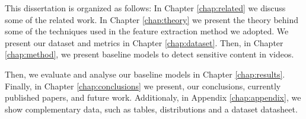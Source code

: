 This dissertation is organized as follows:
In Chapter \ref{chap:related} we discuss some of the related work.
In Chapter \ref{chap:theory} we present the theory behind some of the techniques used in the feature extraction method we adopted.
We present our dataset and metrics in Chapter \ref{chap:dataset}.
Then, in Chapter \ref{chap:method}, we present baseline models to detect sensitive content in videos.

Then, we evaluate and analyse our baseline models in Chapter \ref{chap:results}.
Finally, in Chapter \ref{chap:conclusions} we present, our conclusions, currently published papers, and future work.
Additionaly, in Appendix \ref{chap:appendix}, we show complementary data, such as tables, distributions and a dataset datasheet.